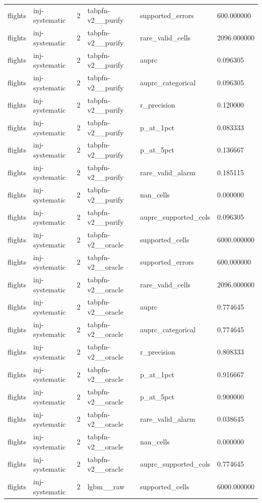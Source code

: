 \begin{tabular}{llllll}
flights & inj-systematic & 2 & tabpfn-v2\_\_purify & supported\_errors & 600.000000 \\
flights & inj-systematic & 2 & tabpfn-v2\_\_purify & rare\_valid\_cells & 2096.000000 \\
flights & inj-systematic & 2 & tabpfn-v2\_\_purify & auprc & 0.096305 \\
flights & inj-systematic & 2 & tabpfn-v2\_\_purify & auprc\_categorical & 0.096305 \\
flights & inj-systematic & 2 & tabpfn-v2\_\_purify & r\_precision & 0.120000 \\
flights & inj-systematic & 2 & tabpfn-v2\_\_purify & p\_at\_1pct & 0.083333 \\
flights & inj-systematic & 2 & tabpfn-v2\_\_purify & p\_at\_5pct & 0.136667 \\
flights & inj-systematic & 2 & tabpfn-v2\_\_purify & rare\_valid\_alarm & 0.185115 \\
flights & inj-systematic & 2 & tabpfn-v2\_\_purify & nan\_cells & 0.000000 \\
flights & inj-systematic & 2 & tabpfn-v2\_\_purify & auprc\_supported\_cols & 0.096305 \\
flights & inj-systematic & 2 & tabpfn-v2\_\_oracle & supported\_cells & 6000.000000 \\
flights & inj-systematic & 2 & tabpfn-v2\_\_oracle & supported\_errors & 600.000000 \\
flights & inj-systematic & 2 & tabpfn-v2\_\_oracle & rare\_valid\_cells & 2096.000000 \\
flights & inj-systematic & 2 & tabpfn-v2\_\_oracle & auprc & 0.774645 \\
flights & inj-systematic & 2 & tabpfn-v2\_\_oracle & auprc\_categorical & 0.774645 \\
flights & inj-systematic & 2 & tabpfn-v2\_\_oracle & r\_precision & 0.808333 \\
flights & inj-systematic & 2 & tabpfn-v2\_\_oracle & p\_at\_1pct & 0.916667 \\
flights & inj-systematic & 2 & tabpfn-v2\_\_oracle & p\_at\_5pct & 0.900000 \\
flights & inj-systematic & 2 & tabpfn-v2\_\_oracle & rare\_valid\_alarm & 0.038645 \\
flights & inj-systematic & 2 & tabpfn-v2\_\_oracle & nan\_cells & 0.000000 \\
flights & inj-systematic & 2 & tabpfn-v2\_\_oracle & auprc\_supported\_cols & 0.774645 \\
flights & inj-systematic & 2 & lgbm\_\_raw & supported\_cells & 6000.000000 \\

\end{tabular}
